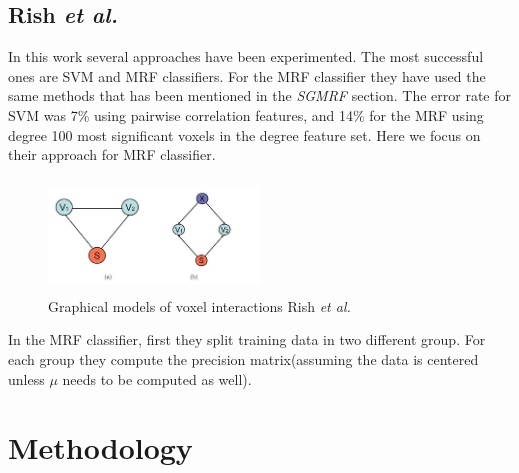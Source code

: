 \documentclass{article} %
\begin{document}
\subsection{Rish \emph{et al.}}
In this work several approaches have been experimented. The most successful ones are SVM and MRF classifiers. For the MRF classifier they have used the same methods that has been mentioned in the \textit{SGMRF} section. The error rate for SVM was 7\% using pairwise correlation features, and 14\% for the MRF using degree 100 most significant voxels in the degree feature set. Here we focus on their approach for MRF classifier.\\
\begin{figure}\label{voxel}
\begin{center}
\includegraphics[width=0.5\textwidth, height=3.0cm]{diagrams/voxel.jpg}
\caption{Graphical models of voxel interactions Rish \emph{et al.}}
\end{center}
\end{figure} 

In the MRF classifier, first they split training data in two different group. For each group they compute the precision matrix(assuming the data is centered unless $\mu$ needs to be computed as well).  
\section{Methodology}
\end{document}
